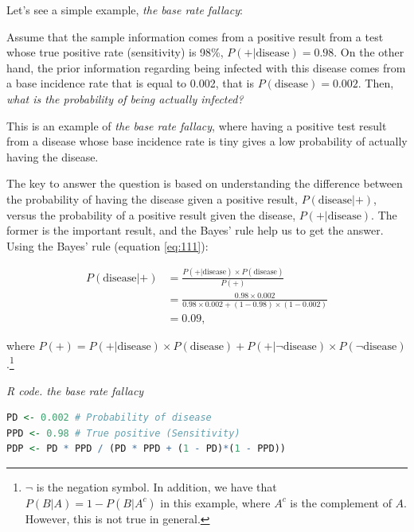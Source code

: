 Let's see a simple example, \textit{the base rate fallacy}:

Assume that the sample information comes from a positive result from a test whose true positive rate (sensitivity) is 98\%, $P(+|\text{disease})=0.98$. On the other hand, the prior information regarding being infected with this disease comes from a base incidence rate that is equal to 0.002, that is $P(\text{disease})=0.002$. Then, \textit{what is the probability of being actually infected?}

This is an example of \textit{the base rate fallacy}, where having a positive test result from a disease whose base incidence rate is tiny gives a low probability of actually having the disease.

The key to answer the question is based on understanding the difference between the probability of having the disease given a positive result, $P(\text{disease}|+)$, versus the probability of a positive result given the disease, $P(+|\text{disease})$. The former is the important result, and the Bayes' rule help us to get the answer. Using the Bayes' rule (equation \ref{eq:111}):

\begin{align*}
	P(\text{disease}|+) & = \frac{P(+|\text{disease})\times P(\text{disease})}{P(+)}\\
	& = \frac{0.98 \times 0.002}{0.98 \times 0.002 + (1-0.98) \times (1-0.002)}\\
	& =0.09, 
\end{align*}

where $P(+)=P(+|\text{disease})\times P(\text{disease})+P(+|\lnot\text{disease})\times P( \lnot\text{disease})$.\footnote{$\lnot$ is the negation symbol. In addition, we have that $P(B|A)=1-P(B|A^c)$ in this example, where $A^c$ is the complement of $A$. However, this is not true in general.}

\begin{tcolorbox}[enhanced,width=4.67in,center upper,
	fontupper=\large\bfseries,drop shadow southwest,sharp corners]
\textit{R code. the base rate fallacy}
\begin{VF}
\begin{lstlisting}[basicstyle=\footnotesize, language=R]
PD <- 0.002 # Probability of disease
PPD <- 0.98 # True positive (Sensitivity)
PDP <- PD * PPD / (PD * PPD + (1 - PD)*(1 - PPD))
\end{lstlisting}
\end{VF}
\end{tcolorbox}

